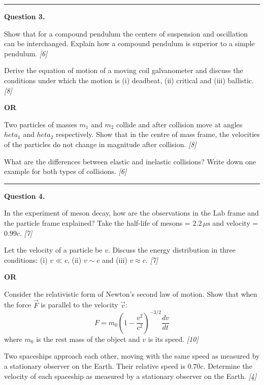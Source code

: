 \documentclass[11pt,a4paper]{article}
\newcommand{\pts}[1]{\hfill   \textit{[#1]}}
\begin{document}
\medskip\rule{\linewidth}{0.2pt}

\medskip


\noindent   \textbf{Question 3.}

\begin{parts}
  \item Show that for a compound pendulum the centers of suspension and oscillation can be interchanged. Explain how a compound pendulum is superior to a simple pendulum. \pts{6}
  \item Derive the equation of motion of a moving coil galvanometer and discuss the conditions under which the motion is (i) deadbeat, (ii) critical and (iii) ballistic. \pts{8}
\end{parts}
\hfill   \textbf{OR}

\begin{parts}
  \item Two particles of masses $m_1$ and $m_2$ collide and after collision move at angles $ heta_1$ and $ heta_2$ respectively. Show that in the centre of mass frame, the velocities of the particles do not change in magnitude after collision. \pts{8}
  \item What are the differences between elastic and inelastic collisions? Write down one example for both types of collisions. \pts{6}
\end{parts}

\medskip\rule{\linewidth}{0.2pt}

\medskip


\noindent   \textbf{Question 4.}

\begin{parts}
  \item In the experiment of meson decay, how are the observations in the Lab frame and the particle frame explained? Take the half-life of mesons = $2.2\,\mu \text{s}$ and velocity = $0.99c$. \pts{7}
  \item Let the velocity of a particle be $v$. Discuss the energy distribution in three conditions: (i) $v \ll c$, (ii) $v \sim c$ and (iii) $v \approx c$. \pts{7}
\end{parts}
\hfill   \textbf{OR}

\begin{parts}
  \item Consider the relativistic form of Newton's second law of motion. Show that when the force $\vec{F}$ is parallel to the velocity $\vec{v}$:
  \[
  F = m_0 \left(1 - \frac{v^2}{c^2}\right)^{-3/2} \frac{dv}{dt}
  \]
  where $m_0$ is the rest mass of the object and $v$ is its speed. \pts{10}
  \item Two spaceships approach each other, moving with the same speed as measured by a stationary observer on the Earth. Their relative speed is $0.70c$. Determine the velocity of each spaceship as measured by a stationary observer on the Earth. \pts{4}
\end{parts}
\end{document}
